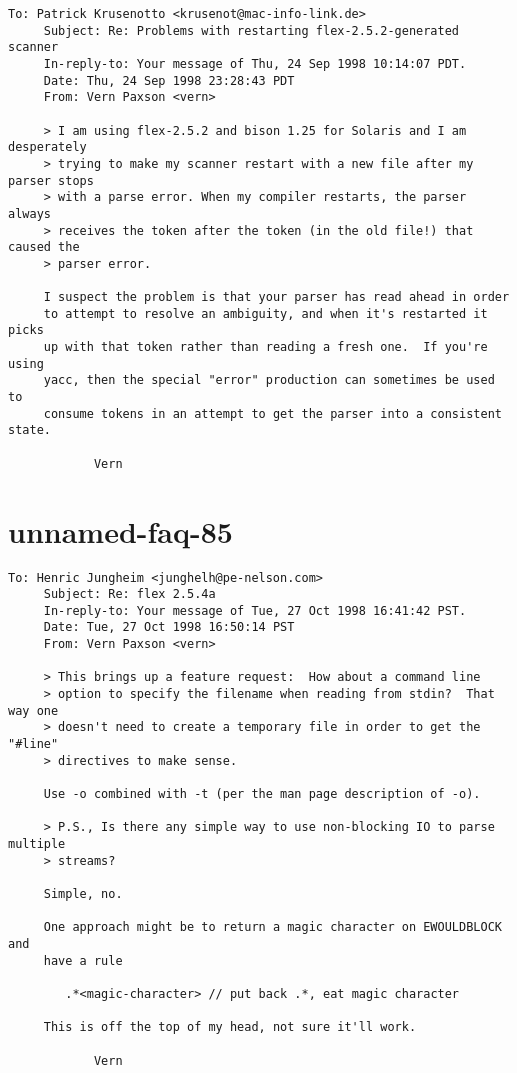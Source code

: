 \documentclass[openany,oneside]{book}
\begin{document}
\begin{verbatim}
To: Patrick Krusenotto <krusenot@mac-info-link.de>
     Subject: Re: Problems with restarting flex-2.5.2-generated scanner
     In-reply-to: Your message of Thu, 24 Sep 1998 10:14:07 PDT.
     Date: Thu, 24 Sep 1998 23:28:43 PDT
     From: Vern Paxson <vern>
     
     > I am using flex-2.5.2 and bison 1.25 for Solaris and I am desperately
     > trying to make my scanner restart with a new file after my parser stops
     > with a parse error. When my compiler restarts, the parser always
     > receives the token after the token (in the old file!) that caused the
     > parser error.
     
     I suspect the problem is that your parser has read ahead in order
     to attempt to resolve an ambiguity, and when it's restarted it picks
     up with that token rather than reading a fresh one.  If you're using
     yacc, then the special "error" production can sometimes be used to
     consume tokens in an attempt to get the parser into a consistent state.
     
     		Vern
\end{verbatim}

\section{unnamed-faq-85}

\begin{verbatim}
To: Henric Jungheim <junghelh@pe-nelson.com>
     Subject: Re: flex 2.5.4a
     In-reply-to: Your message of Tue, 27 Oct 1998 16:41:42 PST.
     Date: Tue, 27 Oct 1998 16:50:14 PST
     From: Vern Paxson <vern>
     
     > This brings up a feature request:  How about a command line
     > option to specify the filename when reading from stdin?  That way one
     > doesn't need to create a temporary file in order to get the "#line"
     > directives to make sense.
     
     Use -o combined with -t (per the man page description of -o).
     
     > P.S., Is there any simple way to use non-blocking IO to parse multiple
     > streams?
     
     Simple, no.
     
     One approach might be to return a magic character on EWOULDBLOCK and
     have a rule
     
     	.*<magic-character>	// put back .*, eat magic character
     
     This is off the top of my head, not sure it'll work.
     
     		Vern
\end{verbatim}
\end{document}
